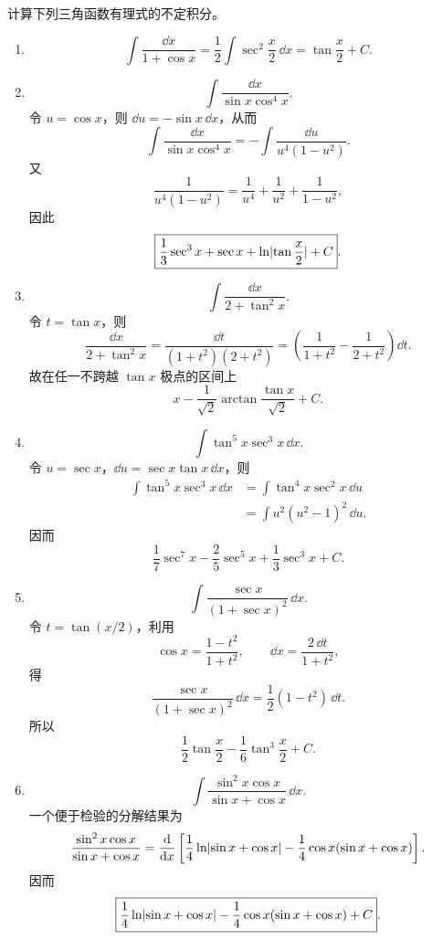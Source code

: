 \begin{xsolution}
计算下列三角函数有理式的不定积分。
  \begin{enumerate}[label=(\arabic*)]
    \item
    \[
      \int\frac{\dd x}{1+\cos x}
      =\frac12\int\sec^2\frac x2\,\dd x
      =\boxed{\tan\frac x2+C}.
    \]

    \item
    \[
      \int\frac{\dd x}{\sin x\cos^4x}.
    \]
    令 $u=\cos x$，则 $\dd u=-\sin x\,\dd x$，从而
    \[
      \int\frac{\dd x}{\sin x\cos^4x}
      =-\int\frac{\dd u}{u^4(1-u^2)}.
    \]
    又
    \[
      \frac1{u^4(1-u^2)}=\frac1{u^4}+\frac1{u^2}+\frac1{1-u^2},
    \]
    因此
    \[
      \boxed{
      \frac13\sec^3x+\sec x+\ln\lvert\tan\frac x2\rvert+C}.
    \]

    \item
    \[
      \int\frac{\dd x}{2+\tan^2x}.
    \]
    令 $t=\tan x$，则
    \[
      \frac{\dd x}{2+\tan^2x}
      =\frac{\dd t}{(1+t^2)(2+t^2)}
      =\left(\frac1{1+t^2}-\frac1{2+t^2}\right)\dd t.
    \]
    故在任一不跨越 $\tan x$ 极点的区间上
    \[
      \boxed{x-\frac1{\sqrt2}\arctan\frac{\tan x}{\sqrt2}+C}.
    \]

    \item
    \[
      \int\tan^5x\sec^3x\,\dd x.
    \]
    令 $u=\sec x$，$\dd u=\sec x\tan x\,\dd x$，则
    \begin{align*}
      \int\tan^5x\sec^3x\,\dd x
      &=\int\tan^4x\sec^2x\,\dd u\\
      &=\int u^2(u^2-1)^2\,\dd u.
    \end{align*}
    因而
    \[
      \boxed{\frac17\sec^7x-\frac25\sec^5x+\frac13\sec^3x+C}.
    \]

    \item
    \[
      \int\frac{\sec x}{(1+\sec x)^2}\,\dd x.
    \]
    令 $t=\tan(x/2)$，利用
    \[
      \cos x=\frac{1-t^2}{1+t^2},
      \qquad
      \dd x=\frac{2\,\dd t}{1+t^2},
    \]
    得
    \[
      \frac{\sec x}{(1+\sec x)^2}\,\dd x
      =\frac12(1-t^2)\,\dd t.
    \]
    所以
    \[
      \boxed{\frac12\tan\frac x2-\frac16\tan^3\frac x2+C}.
    \]

    \item
    \[
      \int\frac{\sin^2x\cos x}{\sin x+\cos x}\,\dd x.
    \]
    一个便于检验的分解结果为
    \[
      \frac{\sin^2x\cos x}{\sin x+\cos x}
      =\frac{\mathop{}\!\mathrm{d}}{\mathop{}\!\mathrm{d} x}\left[
        \frac14\ln\lvert\sin x+\cos x\rvert
        -\frac14\cos x(\sin x+\cos x)
      \right].
    \]
    因而
    \[
      \boxed{\frac14\ln\lvert\sin x+\cos x\rvert
      -\frac14\cos x(\sin x+\cos x)+C}.
    \]


\end{enumerate}
\end{xsolution}
